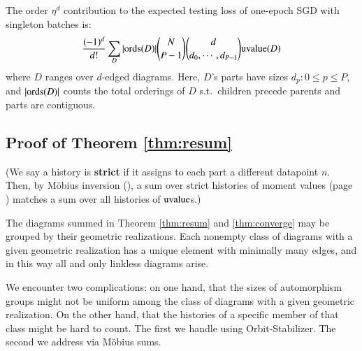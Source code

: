         \begin{prop} \label{prop:vanilla}
            The order $\eta^d$ contribution to the expected testing loss of
            one-epoch SGD with singleton batches is:
            \begin{equation*}\label{eq:sgdbasiccoef}
                \frac{(-1)^d}{d!} \sum_{D} 
                |\text{\textnormal{ords}}(D)| {N \choose P-1} {d \choose d_0,\cdots,d_{P-1}}
                \text{\textnormal{uvalue}}(D)
            \end{equation*}
            where $D$ ranges over $d$-edged diagrams.  Here, $D$'s parts have
            sizes $d_p: 0\leq p\leq P$, and $|\text{\textnormal{ords}}(D)|$ counts the total
            orderings of $D$ s.t.\ children precede parents and parts are
            contiguous.
        \end{prop}


    
    \subsection{Proof of Theorem \ref{thm:resum}}    \label{appendix:resum}

        (We say a history is \textbf{strict} if it assigns to each part
        a different datapoint $n$.
        Then, by M\"obius inversion (\cite{ro64}), a sum over strict histories
        of moment values (page \pageref{appendix:evaluate-histories}) matches 
        a sum over all histories of $\text{\textnormal{uvalue}}$s.)

        The diagrams summed in Theorem \ref{thm:resum} and \ref{thm:converge}
        may be grouped by their geometric realizations.  Each nonempty class of
        diagrams with a given geometric realization has a unique element with
        minimally many edges, and in this way all and only linkless diagrams
        arise. 

        We encounter two complications: on one hand, that the sizes of
        automorphism groups might not be uniform among the class of diagrams
        with a given geometric realization.  On the other hand, that the
        histories of a specific member of that class might be hard to count.
        The first we handle using Orbit-Stabilizer.  The second we address
        via M\"obius sums.
           
